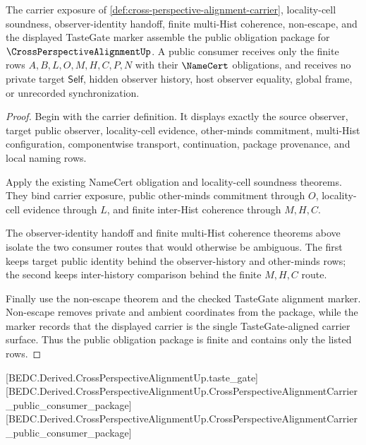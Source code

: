 \begin{theorem}
\label{thm:cross-perspective-alignment-public-consumer-package}
The carrier exposure of \autoref{def:cross-perspective-alignment-carrier}, locality-cell soundness, observer-identity handoff, finite multi-Hist coherence, non-escape, and the displayed TasteGate marker assemble the public obligation package for $\CrossPerspectiveAlignmentUp$. A public consumer receives only the finite rows $A,B,L,O,M,H,C,P,N$ with their $\NameCert$ obligations, and receives no private target $\mathsf{Self}$, hidden observer history, host observer equality, global frame, or unrecorded synchronization.
\end{theorem}
\begin{proof}
Begin with the carrier definition. It displays exactly the source observer, target public observer, locality-cell evidence, other-minds commitment, multi-Hist configuration, componentwise transport, continuation, package provenance, and local naming rows.

Apply the existing NameCert obligation and locality-cell soundness theorems. They bind carrier exposure, public other-minds commitment through $O$, locality-cell evidence through $L$, and finite inter-Hist coherence through $M,H,C$.

The observer-identity handoff and finite multi-Hist coherence theorems above isolate the two consumer routes that would otherwise be ambiguous. The first keeps target public identity behind the observer-history and other-minds rows; the second keeps inter-history comparison behind the finite $M,H,C$ route.

Finally use the non-escape theorem and the checked TasteGate alignment marker. Non-escape removes private and ambient coordinates from the package, while the marker records that the displayed carrier is the single TasteGate-aligned carrier surface. Thus the public obligation package is finite and contains only the listed rows.
\end{proof}

[BEDC.Derived.CrossPerspectiveAlignmentUp.taste\_gate]
[BEDC.Derived.CrossPerspectiveAlignmentUp.CrossPerspectiveAlignmentCarrier\_public\_consumer\_package]
[BEDC.Derived.CrossPerspectiveAlignmentUp.CrossPerspectiveAlignmentCarrier\_public\_consumer\_package]

